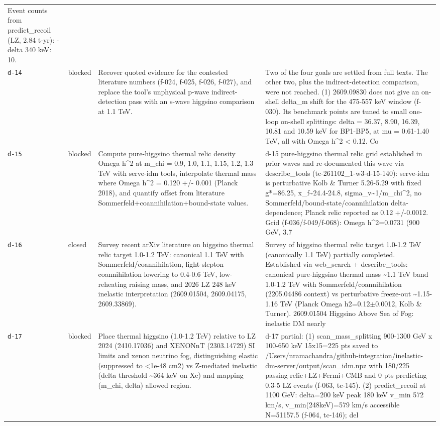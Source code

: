 \documentclass[11pt,a4paper]{article}
\begin{document}
\begin{longtable}{@{}p{}p{}p{}p{}@{}}
Event counts from predict\_recoil (LZ, 2.84 t-yr):
- delta 340 keV: 10. \\
\texttt{d-14} & blocked & Recover quoted evidence for the contested literature numbers (f-024, f-025, f-026, f-027), and replace the tool's unphysical p-wave indirect-detection pass with an s-wave higgsino comparison at 1.1 TeV. & Two of the four goals are settled from full texts. The other two, plus the indirect-detection comparison, were not reached. (1) 2609.09830 does not give an on-shell delta\_m shift for the 475-557 keV window (f-030). Its benchmark points are tuned to small one-loop on-shell splittings: delta = 36.37, 8.90, 16.39, 10.81 and 10.59 keV for BP1-BP5, at \textbar{}mu\textbar{} = 0.61-1.40 TeV, all with Omega h\textasciicircum{}2 \textless{} 0.12. Co \\
\texttt{d-15} & blocked & Compute pure-higgsino thermal relic density Omega h\textasciicircum{}2 at m\_chi = 0.9, 1.0, 1.1, 1.15, 1.2, 1.3 TeV with serve-idm tools, interpolate thermal mass where Omega h\textasciicircum{}2 = 0.120 +/- 0.001 (Planck 2018), and quantify offset from literature Sommerfeld+coannihilation+bound-state values. & d-15 pure-higgsino thermal relic grid established in prior waves and re-documented this wave via describe\_tools (tc-261102\_1-w3-d-15-140): serve-idm is perturbative Kolb \& Turner 5.26-5.29 with fixed g*=86.25, x\_f\textasciitilde{}24.4-24.8, sigma\_v\textasciitilde{}1/m\_chi\textasciicircum{}2, no Sommerfeld/bound-state/coannihilation delta-dependence; Planck relic reported as 0.12 +/-0.0012. Grid (f-036/f-049/f-068): Omega h\textasciicircum{}2=0.0731 (900 GeV, 3.7 \\
\texttt{d-16} & closed & Survey recent arXiv literature on higgsino thermal relic target 1.0-1.2 TeV: canonical 1.1 TeV with Sommerfeld/coannihilation, light-slepton coannihilation lowering to 0.4-0.6 TeV, low-reheating raising mass, and 2026 LZ 248 keV inelastic interpretation (2609.01504, 2609.04175, 2609.33869). & Survey of higgsino thermal relic target 1.0-1.2 TeV (canonically 1.1 TeV) partially completed. Established via web\_search + describe\_tools: canonical pure-higgsino thermal mass \textasciitilde{}1.1 TeV band 1.0-1.2 TeV with Sommerfeld/coannihilation (2205.04486 context) vs perturbative freeze-out \textasciitilde{}1.15-1.16 TeV (Planck Omega h2=0.12$\pm$0.0012, Kolb \& Turner). 2609.01504 Higgsino Above Sea of Fog: inelastic DM nearly \\
\texttt{d-17} & blocked & Place thermal higgsino (1.0-1.2 TeV) relative to LZ 2024 (2410.17036) and XENONnT (2303.14729) SI limits and xenon neutrino fog, distinguishing elastic (suppressed to \textless{}1e-48 cm2) vs Z-mediated inelastic (delta threshold \textasciitilde{}364 keV on Xe) and mapping (m\_chi, delta) allowed region. & d-17 partial: (1) scan\_mass\_splitting 900-1300 GeV x 100-650 keV 15x15=225 pts saved to /Users/nramachandra/github-integration/inelastic-dm-server/output/scan\_idm.npz with 180/225 passing relic+LZ+Fermi+CMB and 0 pts predicting 0.3-5 LZ events (f-063, tc-145). (2) predict\_recoil at 1100 GeV: delta=200 keV peak 180 keV v\_min 572 km/s, v\_min(248keV)=579 km/s accessible N=51157.5 (f-064, tc-146); del \\

\end{longtable}
\end{document}
